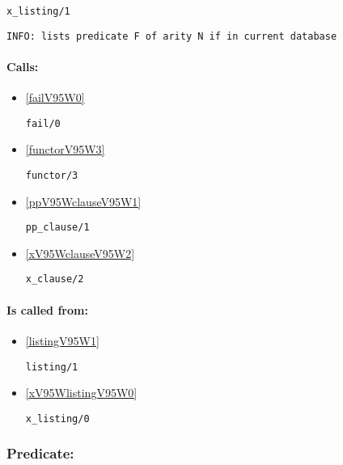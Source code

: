 \begin{verbatim}
x_listing/1
\end{verbatim}

{\small \begin{verbatim}
INFO: lists predicate F of arity N if in current database

\end{verbatim}}
\paragraph{Calls:} 
\begin{itemize}
\item \ref{failV95W0} 
\begin{verbatim}
fail/0
\end{verbatim}

\item \ref{functorV95W3} 
\begin{verbatim}
functor/3
\end{verbatim}

\item \ref{ppV95WclauseV95W1} 
\begin{verbatim}
pp_clause/1
\end{verbatim}

\item \ref{xV95WclauseV95W2} 
\begin{verbatim}
x_clause/2
\end{verbatim}

\end{itemize}
\paragraph{Is called from:} 
\begin{itemize}
\item \ref{listingV95W1} 
\begin{verbatim}
listing/1
\end{verbatim}

\item \ref{xV95WlistingV95W0} 
\begin{verbatim}
x_listing/0
\end{verbatim}

\end{itemize}

\subsubsection{Predicate:} \label{xV95WprofileV95W0}

